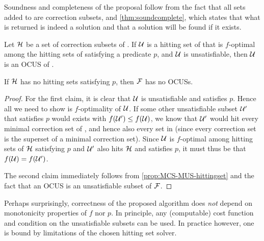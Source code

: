 Soundness and completeness of the proposal follow from the fact that all sets added to \setstohit are correction subsets, and \cref{thm:soundcomplete}, which states that what is returned is indeed a solution and that a solution will be found if it exists. 
 
\begin{theorem}\label{thm:soundcomplete}
  Let $\mathcal{H}$ be a set of correction subsets of \mcses{\formula}. 
  If $\mathcal{U}$ is a hitting set of  that is $f$-optimal among the hitting sets of  satisfying a predicate $p$, and  $\mathcal{U}$ is unsatisfiable, then $\mathcal{U}$ is an OCUS of \formula. 
  
  If  $\mathcal{H}$ has no hitting sets satisfying $p$, then $\mathcal{F} $ has no OCUSs.
\end{theorem}
\begin{proof}
For the first claim, it is clear that $\mathcal{U}$ is unsatisfiable and satisfies $p$. Hence all we need to show is $f$-optimality of $\mathcal{U}$.
  If some other unsatisfiable subset $\mathcal{U}'$ that satisfies $p$ would exists with $f(\mathcal{U}')\leq f(\mathcal{U})$, we know that $\mathcal{U}'$ would hit every minimal correction set of , and hence also every set in  (since every correction set is the superset of a minimal correction set).
  Since $\mathcal{U}$ is $f$-optimal among hitting sets of $\mathcal{H}$ satisfying $p$ and $\mathcal{U}'$ also hits $\mathcal{H}$ and satisfies $p$, it must thus be that $f(\mathcal{U})=f(\mathcal{U'})$. 
%  

The second claim immediately follows from \cref{prop:MCS-MUS-hittingset} and the fact that an OCUS is an unsatisfiable subset of $\mathcal{F} $. 
\end{proof}


Perhaps surprisingly, correctness of the proposed algorithm does \emph{not} depend on monotonicity properties of $f$ nor $p$. In principle, any (computable) cost function and condition on the unsatisfiable subsets can be used. In practice however, one is bound by limitations of the chosen hitting set solver. 



